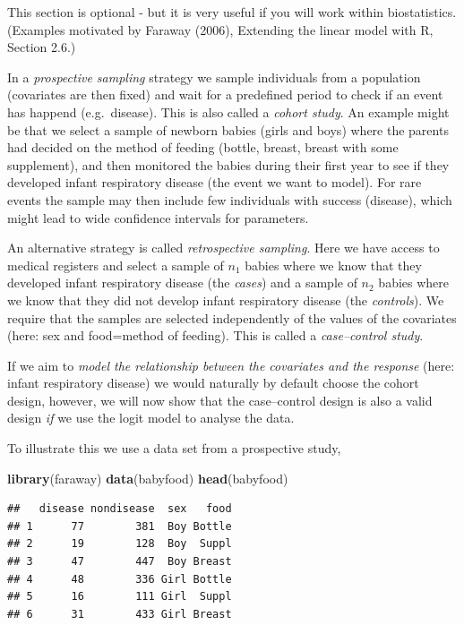 \documentclass[
]{article}
\newenvironment{Shaded}{\begin{snugshade}}{\end{snugshade}}
\newcommand{\FunctionTok}[1]{\textcolor[rgb]{0.13,0.29,0.53}{\textbf{#1}}}
\newcommand{\NormalTok}[1]{#1}
\begin{document}
This section is optional - but it is very useful if you will work within
biostatistics. (Examples motivated by Faraway (2006), Extending the
linear model with R, Section 2.6.)

In a \emph{prospective sampling} strategy we sample individuals from a
population (covariates are then fixed) and wait for a predefined period
to check if an event has happend (e.g.~disease). This is also called a
\emph{cohort study}. An example might be that we select a sample of
newborn babies (girls and boys) where the parents had decided on the
method of feeding (bottle, breast, breast with some supplement), and
then monitored the babies during their first year to see if they
developed infant respiratory disease (the event we want to model). For
rare events the sample may then include few individuals with success
(disease), which might lead to wide confidence intervals for parameters.

An alternative strategy is called \emph{retrospective sampling}. Here we
have access to medical registers and select a sample of \(n_1\) babies
where we know that they developed infant respiratory disease (the
\emph{cases}) and a sample of \(n_2\) babies where we know that they did
not develop infant respiratory disease (the \emph{controls}). We require
that the samples are selected independently of the values of the
covariates (here: sex and food=method of feeding). This is called a
\emph{case--control study}.

If we aim to \emph{model the relationship between the covariates and the
response} (here: infant respiratory disease) we would naturally by
default choose the cohort design, however, we will now show that the
case--control design is also a valid design \emph{if} we use the logit
model to analyse the data.

To illustrate this we use a data set from a prospective study,

\begin{Shaded}
\begin{Highlighting}[]
\FunctionTok{library}\NormalTok{(faraway)}
\FunctionTok{data}\NormalTok{(babyfood)}
\FunctionTok{head}\NormalTok{(babyfood)}
\end{Highlighting}
\end{Shaded}

\begin{verbatim}
##   disease nondisease  sex   food
## 1      77        381  Boy Bottle
## 2      19        128  Boy  Suppl
## 3      47        447  Boy Breast
## 4      48        336 Girl Bottle
## 5      16        111 Girl  Suppl
## 6      31        433 Girl Breast
\end{verbatim}
\end{document}
